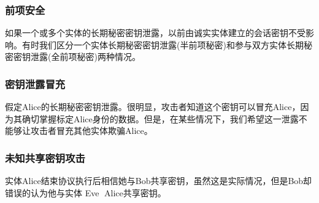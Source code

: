 \documentclass[11pt,a4paper]{article}
\begin{document}
\subsubsection{前项安全} 如果一个或多个实体的长期秘密密钥泄露，以前由诚实实体建立的会话密钥不受影响。有时我们区分一个实体长期秘密密钥泄露(半前项秘密)和参与双方实体长期秘密密钥泄露(全前项秘密)两种情况。
\subsubsection{密钥泄露冒充} 假定Alice的长期秘密密钥泄露。很明显，攻击者知道这个密钥可以冒充Alice，因为其确切掌握标定Alice身份的数据。但是，在某些情况下，我们希望这一泄露不能够让攻击者冒充其他实体欺骗Alice。
\subsubsection{未知共享密钥攻击} 实体Alice结束协议执行后相信她与Bob共享密钥，虽然这是实际情况，但是Bob却错误的认为他与实体 Eve Alice共享密钥。
\end{document}
